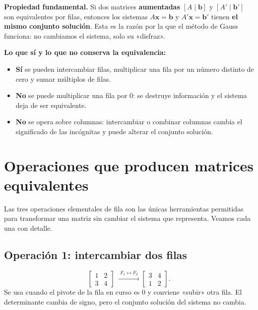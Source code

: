 \documentclass[12pt, letterpaper]{article}
\newcommand{\mwmat}[1]{\ensuremath{\begin{bmatrix}#1\end{bmatrix}}}
\begin{document}
\begin{cuadroteoria}
  \small
  \textbf{Propiedad fundamental.} Si dos matrices \textbf{aumentadas}
  $[A\mid\mathbf{b}]$ y $[A'\mid\mathbf{b}']$ son equivalentes por filas,
  entonces los sistemas $A\mathbf{x}=\mathbf{b}$ y
  $A'\mathbf{x}=\mathbf{b}'$ tienen \textbf{el mismo conjunto solución}.
  Esta es la razón por la que el método de Gauss funciona: no cambiamos el
  sistema, solo su «disfraz».
\end{cuadroteoria}

\begin{cuadroadvertencia}
  \small
  \textbf{Lo que sí y lo que no conserva la equivalencia:}
  \begin{itemize}[leftmargin=1.2em, nosep]
    \item \textbf{Sí} se pueden intercambiar filas, multiplicar una fila por
          un número distinto de cero y sumar múltiplos de filas.
    \item \textbf{No} se puede multiplicar una fila por $0$: se destruye
          información y el sistema deja de ser equivalente.
    \item \textbf{No} se opera sobre columnas: intercambiar o combinar
          columnas cambia el significado de las incógnitas y puede alterar
          el conjunto solución.
  \end{itemize}
\end{cuadroadvertencia}

\section{Operaciones que producen matrices equivalentes}

Las tres operaciones elementales de fila son las únicas herramientas
permitidas para transformar una matriz sin cambiar el sistema que representa.
Veamos cada una con detalle.

\subsection*{Operación 1: intercambiar dos filas}

\[
  \mwmat{1&2\\3&4}
  \;\xrightarrow{\;F_1\leftrightarrow F_2\;}
  \mwmat{3&4\\1&2}.
\]
Se usa cuando el pivote de la fila en curso es $0$ y conviene «subir» otra
fila. El determinante cambia de signo, pero el conjunto solución del sistema
no cambia.
\end{document}
